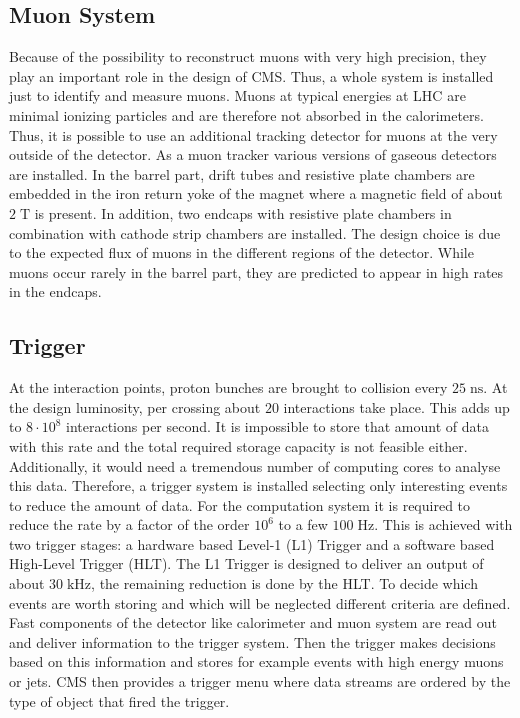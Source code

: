 \subsection{Muon System}
\label{sec:muonsystem}
	Because of the possibility to reconstruct muons with very high precision, they play an important role in the design of CMS. Thus, a whole system is installed just to identify and measure muons. Muons at typical energies at LHC are minimal ionizing particles and are therefore not absorbed in the calorimeters. Thus, it is possible to use an additional tracking detector for muons at the very outside of the detector. As a muon tracker various versions of gaseous detectors are installed. In the barrel part, drift tubes and resistive plate chambers are embedded in the iron return yoke of the magnet where a magnetic field of about $2\;\text{T}$ is present. In addition, two endcaps with resistive plate chambers in combination with cathode strip chambers are installed. The design choice is due to the expected flux of muons in the different regions of the detector. While muons occur rarely in the barrel part, they are predicted to appear in high rates in the endcaps.

\subsection{Trigger}
\label{sec:trigger}
	At the interaction points, proton bunches are brought to collision every $25\;\text{ns}$. At the design luminosity, per crossing about $20$ interactions take place. This adds up to $8 \cdot 10^8$ interactions per second.	It is impossible to store that amount of data with this rate and the total required storage capacity is not feasible either. Additionally, it would need a tremendous number of computing cores to analyse this data. Therefore, a trigger system is installed selecting only interesting events to reduce the amount of data. For the computation system it is required to reduce the rate by a factor of the order $10^6$ to a few $100\;\text{Hz}$. This is achieved with two trigger stages: a hardware based Level-1 (L1) Trigger\cite{L1} and a software based High-Level Trigger (HLT)\cite{HLT}. The L1 Trigger is designed to deliver an output of about $30\;\text{kHz}$, the remaining reduction is done by the HLT.	To decide which events are worth storing and which will be neglected different criteria are defined. Fast components of the detector like calorimeter and muon system are read out and deliver information to the trigger system. Then the trigger makes decisions based on this information and stores for example events with high energy muons or jets. CMS then provides a trigger menu where data streams are ordered by the type of object that fired the trigger.

	
